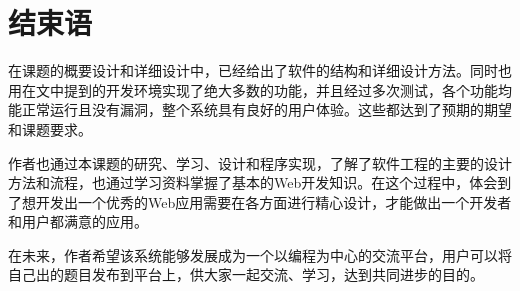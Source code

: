
\chapter{结束语}
在课题的概要设计和详细设计中，已经给出了软件的结构和详细设计方法。同时也用在文中提到的开发环境实现了绝大多数的功能，并且经过多次测试，各个功能均能正常运行且没有漏洞，整个系统具有良好的用户体验。这些都达到了预期的期望和课题要求。

作者也通过本课题的研究、学习、设计和程序实现，了解了软件工程的主要的设计方法和流程，也通过学习资料掌握了基本的Web开发知识。在这个过程中，体会到了想开发出一个优秀的Web应用需要在各方面进行精心设计，才能做出一个开发者和用户都满意的应用。 

在未来，作者希望该系统能够发展成为一个以编程为中心的交流平台，用户可以将自己出的题目发布到平台上，供大家一起交流、学习，达到共同进步的目的。